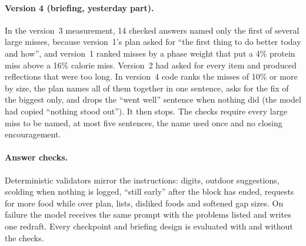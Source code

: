 \documentclass[10pt,twocolumn]{article}
\begin{document}
\paragraph{Version 4 (briefing, yesterday part).} In the version~3 measurement, 14 checked answers named only the first
of several large misses, because version~1's plan asked for ``the first thing to do better today and how'', and version~1
ranked misses by a phase weight that put a 4\% protein miss above a 16\% calorie miss. Version~2 had asked for every
item and produced reflections that were too long. In version~4 code ranks the misses of 10\% or more by size, the plan
names all of them together in one sentence, asks for the fix of the biggest only, and drops the ``went well'' sentence
when nothing did (the model had copied ``nothing stood out''). It then stops. The checks require every large miss to be
named, at most five sentences, the name used once and no closing encouragement.

\paragraph{Answer checks.} Deterministic validators mirror the instructions: digits, outdoor suggestions, scolding
when nothing is logged, ``still early'' after the block has ended, requests for more food while over plan, lists,
disliked foods and softened gap sizes. On failure the model receives the same prompt with the problems listed and
writes one redraft. Every checkpoint and briefing design is evaluated with and without the checks.
\end{document}
